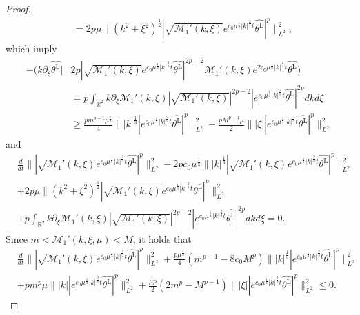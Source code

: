 \documentclass[10pt,a4paper]{amsart}
\begin{document}
\begin{proof}
\begin{align*}
			&=  2p\mu \|  (k^2 + \xi^2)^\frac12 | \sqrt{\mathcal{M}_1'(k, \xi)} e^{c_0 \mu^\frac13 |k|^\frac23 t} \widehat{\theta^{\mathrm{L}} }|^{p}  \|_{L^2}^2,
		\end{align*}
		which imply
		\begin{align*}
			-\big( k\partial_\xi  \widehat{\theta^{\mathrm{L}}} \big| &2p | \sqrt{\mathcal{M}_1'(k, \xi)} e^{c_0 \mu^\frac13 |k|^\frac23 t} \widehat{\theta^{\mathrm{L}} }|^{2p-2} \mathcal{M}_1'(k, \xi) e^{2c_0 \mu^\frac13 |k|^\frac23 t} \widehat{\theta^{\mathrm{L}} } \big) \\
			&= p \int_{\mathbb{R}^2} k\partial_\xi  \mathcal{M}_1'(k, \xi) | \sqrt{\mathcal{M}_1'(k, \xi)} |^{2p-2} |e^{c_0 \mu^\frac13 |k|^\frac23 t} \widehat{\theta^{\mathrm{L}} }|^{2p} dkd\xi  \\
			&\geq  \frac{pm^{p-1} \mu^\frac13 }{4} \| |k|^\frac13 |e^{c_0 \mu^\frac13 |k|^\frac23 t} \widehat{\theta^{\mathrm{L}} }|^{p} \|_{L^2}^2  -  \frac{pM^{p-1} \mu}{2} \| |\xi| |e^{c_0 \mu^\frac13 |k|^\frac23 t} \widehat{\theta^{\mathrm{L}} }|^{p} \|_{L^2}^2
		\end{align*}
		and
		\begin{align*}
			&\frac{d}{dt} \| | \sqrt{\mathcal{M}_1'(k, \xi)} e^{c_0 \mu^\frac13 |k|^\frac23 t} \widehat{\theta^{\mathrm{L}} }|^p \|_{L^2}^2  - 2p c_0 \mu^\frac13 \| |k|^\frac13 | \sqrt{\mathcal{M}_1'(k, \xi)} e^{c_0 \mu^\frac13 |k|^\frac23 t} \widehat{\theta^{\mathrm{L}} }|^p\|_{L^2}^2 \\
			&+2p\mu \|  (k^2 + \xi^2)^\frac12 | \sqrt{\mathcal{M}_1'(k, \xi)} e^{c_0 \mu^\frac13 |k|^\frac23 t} \widehat{\theta^{\mathrm{L}} }|^{p}  \|_{L^2}^2 \\
			& + p \int_{\mathbb{R}^2} k\partial_\xi  \mathcal{M}_1'(k, \xi) | \sqrt{\mathcal{M}_1'(k, \xi)} |^{2p-2} |e^{c_0 \mu^\frac13 |k|^\frac23 t} \widehat{\theta^{\mathrm{L}} }|^{2p} dkd\xi = 0.
		\end{align*}
		Since $m<\mathcal{M}_1'(k, \xi, \mu)<M $, it holds that
		\begin{align*}
			& \frac{d}{dt} \| | \sqrt{\mathcal{M}_1'(k, \xi)} e^{c_0 \mu^\frac13 |k|^\frac23 t} \widehat{\theta^{\mathrm{L}} }|^p \|_{L^2}^2  + \frac{p\mu^\frac13}{4} (m^{p-1}  - 8c_0 M^p)  \| |k|^\frac13 | e^{c_0 \mu^\frac13 |k|^\frac23 t} \widehat{\theta^{\mathrm{L}} }|^p\|_{L^2}^2 \\
			&+ p m^p\mu \|  |k| |  e^{c_0 \mu^\frac13 |k|^\frac23 t} \widehat{\theta^{\mathrm{L}} }|^{p}  \|_{L^2}^2  + \frac{\mu p}{2}(2m^p-M^{p-1})  \| |\xi| |e^{c_0 \mu^\frac13 |k|^\frac23 t} \widehat{\theta^{\mathrm{L}} }|^{p} \|_{L^2}^2 \leq 0.

\end{align*}
\end{proof}
\end{document}
